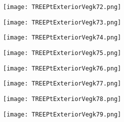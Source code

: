 \documentclass[pdf]{beamer}
\begin{document}
\begin{frame}
\begin{figure}[!h]
\centering
\texttt{[image: TREEPtExteriorVegk72.png]}
\end{figure}
\end{frame}

\begin{frame}
\begin{figure}[!h]
\centering
\texttt{[image: TREEPtExteriorVegk73.png]}
\end{figure}
\end{frame}

\begin{frame}
\begin{figure}[!h]
\centering
\texttt{[image: TREEPtExteriorVegk74.png]}
\end{figure}
\end{frame}

\begin{frame}
\begin{figure}[!h]
\centering
\texttt{[image: TREEPtExteriorVegk75.png]}
\end{figure}
\end{frame}

\begin{frame}
\begin{figure}[!h]
\centering
\texttt{[image: TREEPtExteriorVegk76.png]}
\end{figure}
\end{frame}

\begin{frame}
\begin{figure}[!h]
\centering
\texttt{[image: TREEPtExteriorVegk77.png]}
\end{figure}
\end{frame}

\begin{frame}
\begin{figure}[!h]
\centering
\texttt{[image: TREEPtExteriorVegk78.png]}
\end{figure}
\end{frame}

\begin{frame}
\begin{figure}[!h]
\centering
\texttt{[image: TREEPtExteriorVegk79.png]}
\end{figure}
\end{frame}
\end{document}
